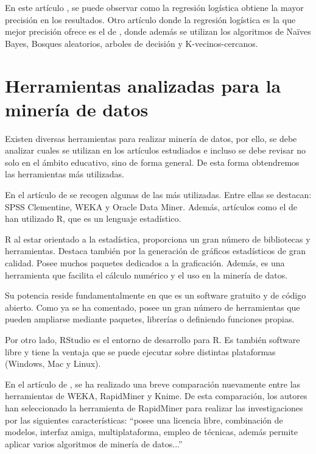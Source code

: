 En este artículo , se puede observar como la regresión logística obtiene la mayor precisión en los resultados. Otro artículo donde la regresión logística es la que mejor precisión ofrece es el de , donde además se utilizan los algoritmos de Naïves Bayes, Bosques aleatorios, arboles de decisión y K-vecinos-cercanos.



\section{Herramientas analizadas para la minería de datos}
Existen diversas herramientas para realizar minería de datos, por ello, se debe analizar cuales se utilizan en los artículos estudiados e incluso se debe revisar no solo en el ámbito educativo, sino de forma general. De esta forma obtendremos las herramientas más utilizadas.

En el artículo de  se recogen algunas de las más utilizadas. Entre ellas se destacan: SPSS Clementine, WEKA y Oracle Data Miner. Además, artículos como el de  han utilizado R, que es un lenguaje estadístico.

R al estar orientado a la estadística, proporciona un gran número de bibliotecas y herramientas. Destaca también por la generación de gráficos estadísticos de gran calidad. Posee muchos paquetes dedicados a la graficación. Además, es una herramienta que facilita el cálculo numérico y el uso en la minería de datos. \cite{emanuel2014}

Su potencia reside fundamentalmente en que es un software gratuito y de código abierto. Como ya se ha comentado, posee un gran número de herramientas que pueden ampliarse mediante paquetes, librerías o definiendo funciones propias.

Por otro lado, RStudio es el entorno de desarrollo para R. Es también software libre y tiene la ventaja que se puede ejecutar sobre distintas plataformas (Windows, Mac y Linux).

En el artículo de , se ha realizado una breve comparación nuevamente entre las herramientas de WEKA, RapidMiner y Knime. De esta comparación, los autores han seleccionado la herramienta de RapidMiner para realizar las investigaciones por las siguientes características: ``posee una licencia libre, combinación de modelos, interfaz amiga, multiplataforma, empleo de técnicas, además permite aplicar varios algoritmos de minería de datos...'' \cite{jaramillo2015aplicacion}

